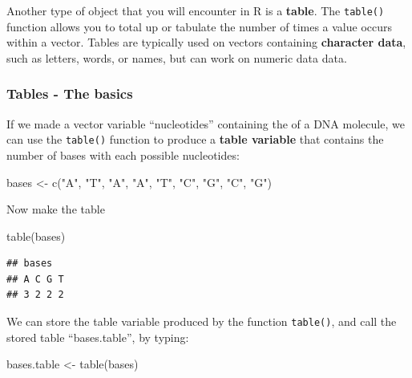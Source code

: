 \documentclass[
]{book}
\newenvironment{Shaded}{\begin{snugshade}}{\end{snugshade}}
\newcommand{\FunctionTok}[1]{\textcolor[rgb]{0.00,0.00,0.00}{#1}}
\newcommand{\NormalTok}[1]{#1}
\newcommand{\OtherTok}[1]{\textcolor[rgb]{0.56,0.35,0.01}{#1}}
\newcommand{\StringTok}[1]{\textcolor[rgb]{0.31,0.60,0.02}{#1}}
\begin{document}
Another type of object that you will encounter in R is a \textbf{table}. The \texttt{table()} function allows you to total up or tabulate the number of times a value occurs within a vector. Tables are typically used on vectors containing \textbf{character data}, such as letters, words, or names, but can work on numeric data data.

\hypertarget{tables---the-basics}{%
\subsubsection{Tables - The basics}\label{tables---the-basics}}

If we made a vector variable ``nucleotides'' containing the of a DNA molecule, we can use the \texttt{table()} function to produce a \textbf{table variable} that contains the number of bases with each possible nucleotides:

\begin{Shaded}
\begin{Highlighting}[]
\NormalTok{bases }\OtherTok{\textless{}{-}} \FunctionTok{c}\NormalTok{(}\StringTok{"A"}\NormalTok{, }\StringTok{"T"}\NormalTok{, }\StringTok{"A"}\NormalTok{, }\StringTok{"A"}\NormalTok{, }\StringTok{"T"}\NormalTok{, }\StringTok{"C"}\NormalTok{, }\StringTok{"G"}\NormalTok{, }\StringTok{"C"}\NormalTok{, }\StringTok{"G"}\NormalTok{)}
\end{Highlighting}
\end{Shaded}

Now make the table

\begin{Shaded}
\begin{Highlighting}[]
\FunctionTok{table}\NormalTok{(bases)}
\end{Highlighting}
\end{Shaded}

\begin{verbatim}
## bases
## A C G T 
## 3 2 2 2
\end{verbatim}

We can store the table variable produced by the function \texttt{table()}, and call the stored table ``bases.table'', by typing:

\begin{Shaded}
\begin{Highlighting}[]
\NormalTok{bases.table }\OtherTok{\textless{}{-}} \FunctionTok{table}\NormalTok{(bases)}
\end{Highlighting}
\end{Shaded}
\end{document}
